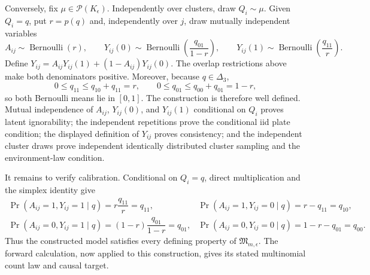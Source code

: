 Conversely, fix \(\mu\in\mathcal P(K_{\epsilon})\). Independently over clusters, draw \(Q_i\sim\mu\). Given \(Q_i=q\), put \(r=p(q)\) and, independently over \(j\), draw mutually independent variables
\[
 A_{ij}\sim\operatorname{Bernoulli}(r),\qquad
 Y_{ij}(0)\sim\operatorname{Bernoulli}\!\left(\frac{q_{01}}{1-r}\right),\qquad
 Y_{ij}(1)\sim\operatorname{Bernoulli}\!\left(\frac{q_{11}}{r}\right).
\]
Define \(Y_{ij}=A_{ij}Y_{ij}(1)+(1-A_{ij})Y_{ij}(0)\). The overlap restrictions above make both denominators positive. Moreover, because \(q\in\Delta_3\),
\[
 0\leq q_{11}\leq q_{10}+q_{11}=r,
 \qquad
 0\leq q_{01}\leq q_{00}+q_{01}=1-r,
\]
so both Bernoulli means lie in \([0,1]\). The construction is therefore well defined. Mutual independence of \(A_{ij}\), \(Y_{ij}(0)\), and \(Y_{ij}(1)\) conditional on \(Q_i\) proves latent ignorability; the independent repetitions prove the conditional iid plate condition; the displayed definition of \(Y_{ij}\) proves consistency; and the independent cluster draws prove independent identically distributed cluster sampling and the environment-law condition.

It remains to verify calibration. Conditional on \(Q_i=q\), direct multiplication and the simplex identity give
\[
 \begin{array}{ll}
 \Pr(A_{ij}=1,Y_{ij}=1\mid q)
 =r\dfrac{q_{11}}r=q_{11},
 &
 \Pr(A_{ij}=1,Y_{ij}=0\mid q)
 =r-q_{11}=q_{10},\\[6pt]
 \Pr(A_{ij}=0,Y_{ij}=1\mid q)
 =(1-r)\dfrac{q_{01}}{1-r}=q_{01},
 &
 \Pr(A_{ij}=0,Y_{ij}=0\mid q)
 =1-r-q_{01}=q_{00}.
 \end{array}
\]
Thus the constructed model satisfies every defining property of \(\mathfrak M_{m,\epsilon}\). The forward calculation, now applied to this construction, gives its stated multinomial count law and causal target.